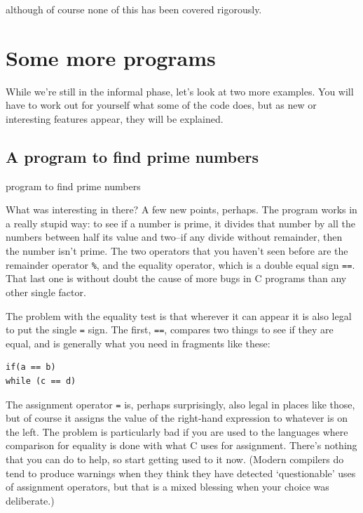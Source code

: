   although of course none of this has been covered rigorously.


  

 
        \section{Some more programs}
        

  

  While we're still in the informal phase, let's look at two more examples.
   You will have to work out for yourself what some of the code does, but as
   new or interesting features appear, they will be explained.


  \subsection{A program to find prime numbers}
   

   \begin{program}[phtb]
     \caption{\label{prg:prime}program to find prime numbers}
 \end{program}
 
   What was interesting in there? A few new points, perhaps. The program
    works in a really stupid way: to see if a number is prime, it divides that
    number by all the numbers between half its value and two--if any
    divide without remainder, then the number isn't prime. The two operators
    that you haven't seen before are the remainder operator \texttt{\%},
    and the equality operator, which is a double equal sign \texttt{==}.
    That last one is without doubt the cause of more bugs in C programs than
    any other single factor.


   The problem with the equality test is that wherever it can appear it is
    also legal to put the single \texttt{=} sign. The first,
    \texttt{==}, compares two things to see if they are equal, and is
    generally what you need in fragments like these:


   \begin{Verbatim}
if(a == b)
while (c == d)
\end{Verbatim}

   The assignment operator \texttt{=} is, perhaps surprisingly, also
    legal in places like those, but of course it assigns the value of the
    right-hand expression to whatever is on the left. The problem is
    particularly bad if you are used to the languages where comparison for
    equality is done with what C uses for assignment. There's nothing that you
    can do to help, so start getting used to it now. (Modern compilers do tend
    to produce warnings when they think they have detected
    `questionable' uses of assignment operators, but that is a mixed
    blessing when your choice was deliberate.)


